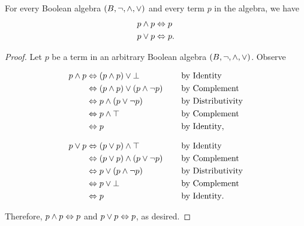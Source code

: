 \begin{theorem}[Idempotency]
    For every Boolean algebra \((B, \neg, \wedge, \vee)\) and every term \(p\) in the algebra,
    we have
    \begin{align*}
        p \wedge p &\Leftrightarrow p\\
        p \vee p &\Leftrightarrow p.
    \end{align*}
\end{theorem}
\begin{proof}
    Let \(p\) be a term in an arbitrary Boolean algebra \((B, \neg, \wedge, \vee)\).
    Observe

    \begin{minipage}{.45\linewidth}
        \vspace{-\parskip-\abovedisplayskip}
        \begin{alignat*}{2}
            p \wedge p &\Leftrightarrow (p \wedge p) \vee \bot~~~~~~~~~~~~&&\text{by Identity}\\
                        &\Leftrightarrow (p \wedge p) \vee (p \wedge \neg p) &&\text{by Complement}\\
                        &\Leftrightarrow p \wedge (p \vee \neg p) &&\text{by Distributivity}\\
                        &\Leftrightarrow p \wedge \top &&\text{by Complement}\\
                        &\Leftrightarrow p &&\text{by Identity},
        \end{alignat*}
    \end{minipage}
    \hfill\vline\hfill
    \begin{minipage}{.45\linewidth}
        \vspace{-\parskip-\abovedisplayskip}
        \begin{alignat*}{2}
            p \vee p &\Leftrightarrow (p \vee p) \wedge \top~~~~~~~~~~~~&&\text{by Identity}\\
                        &\Leftrightarrow (p \vee p) \wedge (p \vee \neg p) &&\text{by Complement}\\
                        &\Leftrightarrow p \vee (p \wedge \neg p) &&\text{by Distributivity}\\
                        &\Leftrightarrow p \vee \bot &&\text{by Complement}\\
                        &\Leftrightarrow p &&\text{by Identity}.
        \end{alignat*}
    \end{minipage}

    Therefore, \(p \wedge p \Leftrightarrow p\) and \(p \vee p \Leftrightarrow p\), as desired.
\end{proof}

